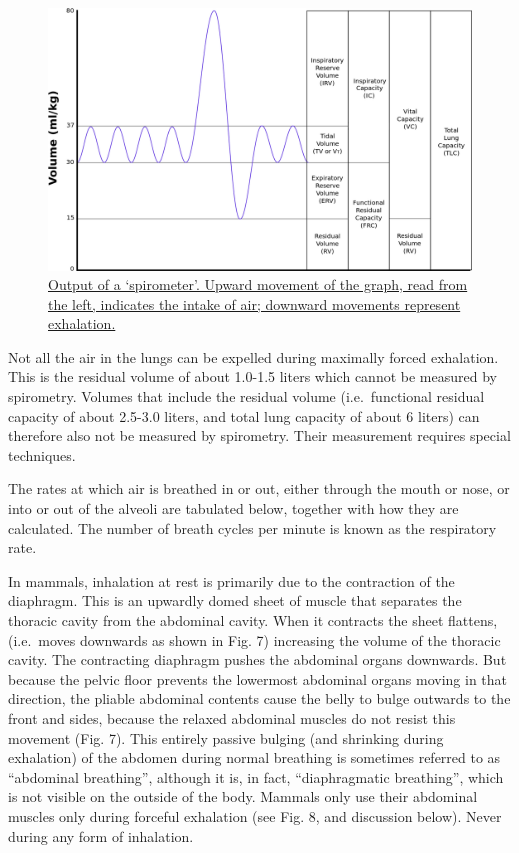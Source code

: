 \begin{figure}

{\centering \includegraphics[width=0.7\linewidth]{./figures/respiratory/Lungvolumes_Updated} 

}

\caption{\href{https://commons.wikimedia.org/wiki/File:Lungvolumes_Updated.png}{Output of a `spirometer'. Upward movement of the graph, read from the left, indicates the intake of air; downward movements represent exhalation.}}\label{fig:spirometeroutput}
\end{figure}

Not all the air in the lungs can be expelled during maximally forced exhalation. This is the residual volume of about 1.0-1.5 liters which cannot be measured by spirometry. Volumes that include the residual volume (i.e.~functional residual capacity of about 2.5-3.0 liters, and total lung capacity of about 6 liters) can therefore also not be measured by spirometry. Their measurement requires special techniques.

The rates at which air is breathed in or out, either through the mouth or nose, or into or out of the alveoli are tabulated below, together with how they are calculated. The number of breath cycles per minute is known as the respiratory rate.

In mammals, inhalation at rest is primarily due to the contraction of the diaphragm. This is an upwardly domed sheet of muscle that separates the thoracic cavity from the abdominal cavity. When it contracts the sheet flattens, (i.e.~moves downwards as shown in Fig. 7) increasing the volume of the thoracic cavity. The contracting diaphragm pushes the abdominal organs downwards. But because the pelvic floor prevents the lowermost abdominal organs moving in that direction, the pliable abdominal contents cause the belly to bulge outwards to the front and sides, because the relaxed abdominal muscles do not resist this movement (Fig. 7). This entirely passive bulging (and shrinking during exhalation) of the abdomen during normal breathing is sometimes referred to as ``abdominal breathing'', although it is, in fact, ``diaphragmatic breathing'', which is not visible on the outside of the body. Mammals only use their abdominal muscles only during forceful exhalation (see Fig. 8, and discussion below). Never during any form of inhalation.

